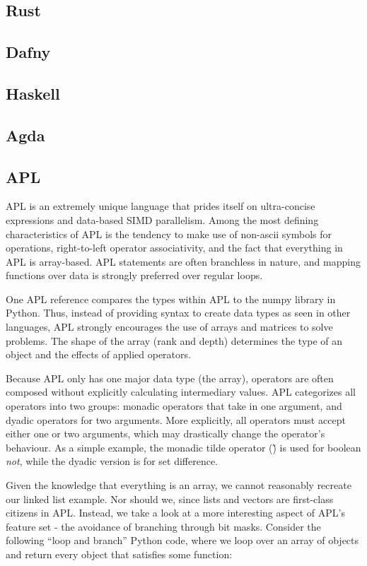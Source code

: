 \documentclass{article}
\begin{document}
\subsection{Rust}
\subsection{Dafny}
\subsection{Haskell}
\subsection{Agda}
\subsection{APL}

APL is an extremely unique language that prides itself on ultra-concise expressions and data-based SIMD parallelism.
Among the most defining characteristics of APL is the tendency to make use of non-ascii symbols for operations,
right-to-left operator associativity, and the fact that everything in APL is array-based. APL statements are often
branchless in nature, and mapping functions over data is strongly preferred over regular loops.

One APL reference \cite{apl} compares the types within APL to the numpy library in Python.
Thus, instead of providing syntax to create data types as seen in other languages,
APL strongly encourages the use of arrays and matrices to solve problems.
The shape of the array (rank and depth) determines the type of an object and the effects of applied operators.

Because APL only has one major data type (the array), operators are often composed without explicitly
calculating intermediary values. APL categorizes all operators into two groups: monadic operators that take
in one argument, and dyadic operators for two arguments. More explicitly, all operators must accept
either one or two arguments, which may drastically change the operator's behaviour.
As a simple example, the monadic tilde operator (\~) is used for boolean \textit{not}, while the dyadic version
is for set difference.

Given the knowledge that everything is an array, we cannot reasonably recreate our linked list example. Nor should we,
since lists and vectors are first-class citizens in APL. Instead, we take a look at a more interesting aspect of APL's
feature set - the avoidance of branching through bit masks. Consider the following ``loop and branch'' Python code,
where we loop over an array of objects and return every object that satisfies some function:
\inputminted{python}{linked_list/apl_example.py}
\end{document}
